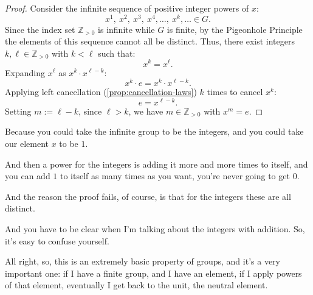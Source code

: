 \begin{content}

\begin{proof}
Consider the infinite sequence of positive integer powers of $x$:
\begin{equation}\label{eq:powers-sequence}
x^1, \ x^2, \ x^3, \ x^4, \dots, \ x^k, \dots \in G.
\end{equation}
Since the index set $\mathbb{Z}_{>0}$ is infinite while $G$ is finite, by the Pigeonhole Principle the elements of this sequence cannot all be distinct. Thus, there exist integers $k, \ell \in \mathbb{Z}_{>0}$ with $k < \ell$ such that:
\[
x^k = x^\ell.
\]
Expanding $x^\ell$ as $x^k \cdot x^{\ell - k}$:
\[
x^k \cdot e = x^k \cdot x^{\ell - k}.
\]
Applying left cancellation (\cref{prop:cancellation-laws}) $k$ times to cancel $x^k$:
\[
e = x^{\ell - k}.
\]
Setting $m := \ell - k$, since $\ell > k$, we have $m \in \mathbb{Z}_{>0}$ with $x^m = e$.
\end{proof}
\end{content}

\begin{speech}[01:22:38 - 01:23:33]
Because you could take the infinite group to be the integers, and you could take our element $x$ to be $1$.

And then a power for the integers is adding it more and more times to itself, and you can add $1$ to itself as many times as you want, you're never going to get $0$.

And the reason the proof fails, of course, is that for the integers these are all distinct.

And you have to be clear when I'm talking about the integers with addition. So, it's easy to confuse yourself.

All right, so, this is an extremely basic property of groups, and it's a very important one: if I have a finite group, and I have an element, if I apply powers of that element, eventually I get back to the unit, the neutral element.
\end{speech}


